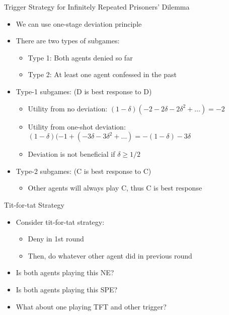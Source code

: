 \documentclass[11pt,aspectratio=169]{beamer}
\begin{document}
  
  \begin{frame}{Trigger Strategy for Infinitely Repeated Prisoners' Dilemma}
   \begin{itemize}[<+->]
   \setlength{\itemsep}{0.7em}
    \item We can use one-stage deviation principle
    \item There are two types of subgames:
    \begin{itemize}[<.->]
     \item Type 1: Both agents denied so far
     \item Type 2: At least one agent confessed in the past
    \end{itemize}
    \item Type-1 subgames: (D is best response to D)
    \begin{itemize}
     \item Utility from no deviation: $(1 - \delta) (-2 - 2\delta - 2\delta^{2} + \dots) = - 2$
     \item Utility from one-shot deviation: $(1 - \delta) (-1 + (-3\delta -3\delta^{2} + \dots) = - (1 - \delta ) - 3\delta$
     \item Deviation is not beneficial if $\delta  \geq  1/2$
    \end{itemize}
    \item Type-2 subgames: (C is best response to C)
    \begin{itemize}
     \item Other agents will always play C, thus C is best response
    \end{itemize}  
   \end{itemize}
  \end{frame}    
    
  \begin{frame}{Tit-for-tat Strategy}
   \begin{itemize}[<+->]
   \setlength{\itemsep}{1.2em}
    \item Consider \alert{tit-for-tat} strategy:
    \begin{itemize}[<.->]
     \item Deny in 1st round
     \item Then, do whatever other agent did in previous round
    \end{itemize}
    \item Is both agents playing this NE?
    \item Is both agents playing this SPE?
    \item What about one playing TFT and other trigger?
   \end{itemize}
  \end{frame}
  
\end{document}
